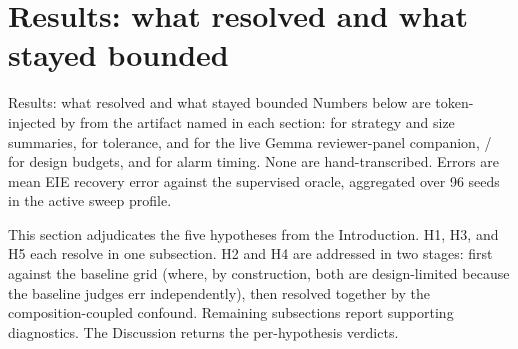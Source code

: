 \documentclass[
  ignorenonframetext,
]{beamer}
\author{\texorpdfstring{}{}}
\date{}
\begin{document}
\section{Results: what resolved and what stayed
bounded}\label{results-what-resolved-and-what-stayed-bounded}

\begin{frame}{Results: what resolved and what
stayed bounded}
Numbers below are token-injected by
 from the artifact
named in each section:  for strategy and
size summaries,  for tolerance,
 and
 for the live Gemma
reviewer-panel companion,  /
 for design budgets, and
 for alarm timing. None are hand-transcribed.
Errors are mean EIE recovery error against the supervised oracle,
aggregated over 96 seeds in the active sweep profile.

This section adjudicates the five hypotheses from the Introduction. H1,
H3, and H5 each resolve in one subsection. H2 and H4 are addressed in
two stages: first against the baseline grid (where, by construction,
both are design-limited because the baseline judges err independently),
then resolved together by the composition-coupled confound. Remaining
subsections report supporting diagnostics. The Discussion returns the
per-hypothesis verdicts.
\end{frame}
\end{document}
